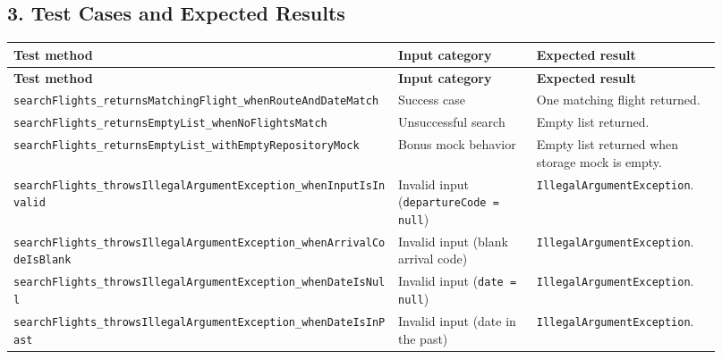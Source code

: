 \documentclass[11pt,a4paper]{article}
\begin{document}
\begin{landscape}
\section*{3. Test Cases and Expected Results}

\renewcommand{\arraystretch}{1.25}

\begin{longtable}{>{\RaggedRight\arraybackslash\small}p{0.50\linewidth}
                  >{\RaggedRight\arraybackslash}p{0.18\linewidth}
                  >{\RaggedRight\arraybackslash}p{0.24\linewidth}}
\toprule
\textbf{Test method} & \textbf{Input category} & \textbf{Expected result} \\
\midrule
\endfirsthead

\toprule
\textbf{Test method} & \textbf{Input category} & \textbf{Expected result} \\
\midrule
\endhead

\bottomrule
\endfoot

\nolinkurl{searchFlights_returnsMatchingFlight_whenRouteAndDateMatch}
& Success case
& One matching flight returned. \\

\nolinkurl{searchFlights_returnsEmptyList_whenNoFlightsMatch}
& Unsuccessful search
& Empty list returned. \\

\nolinkurl{searchFlights_returnsEmptyList_withEmptyRepositoryMock}
& Bonus mock behavior
& Empty list returned when storage mock is empty. \\

\nolinkurl{searchFlights_throwsIllegalArgumentException_whenInputIsInvalid}
& Invalid input (\texttt{departureCode = null})
& \texttt{IllegalArgumentException}. \\

\nolinkurl{searchFlights_throwsIllegalArgumentException_whenArrivalCodeIsBlank}
& Invalid input (blank arrival code)
& \texttt{IllegalArgumentException}. \\

\nolinkurl{searchFlights_throwsIllegalArgumentException_whenDateIsNull}
& Invalid input (\texttt{date = null})
& \texttt{IllegalArgumentException}. \\

\nolinkurl{searchFlights_throwsIllegalArgumentException_whenDateIsInPast}
& Invalid input (date in the past)
& \texttt{IllegalArgumentException}. \\


\end{longtable}
\end{landscape}
\end{document}

